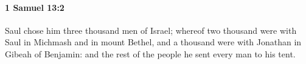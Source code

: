 
		\paragraph{1 Samuel 13:2} %
			\label{1SAMUEL-13-2}

			Saul chose him three thousand men of Israel; whereof two thousand were with Saul in Michmash and in mount Bethel, and a thousand were with Jonathan in Gibeah of Benjamin: and the rest of the people he sent every man to his tent.


